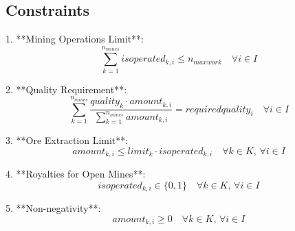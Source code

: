 \documentclass{article}
\begin{document}
\subsection*{Constraints}
1. **Mining Operations Limit**:
\[
\sum_{k=1}^{n_{mines}} isoperated_{k,i} \leq n_{maxwork} \quad \forall i \in I
\]

2. **Quality Requirement**:
\[
\sum_{k=1}^{n_{mines}} \frac{quality_{k} \cdot amount_{k,i}}{\sum_{k=1}^{n_{mines}} amount_{k,i}} = requiredquality_{i} \quad \forall i \in I
\]

3. **Ore Extraction Limit**:
\[
amount_{k,i} \leq limit_{k} \cdot isoperated_{k,i} \quad \forall k \in K, \, \forall i \in I
\]

4. **Royalties for Open Mines**:
\[
isoperated_{k,i} \in \{0, 1\} \quad \forall k \in K, \, \forall i \in I
\]

5. **Non-negativity**:
\[
amount_{k,i} \geq 0 \quad \forall k \in K, \, \forall i \in I
\]
\end{document}

